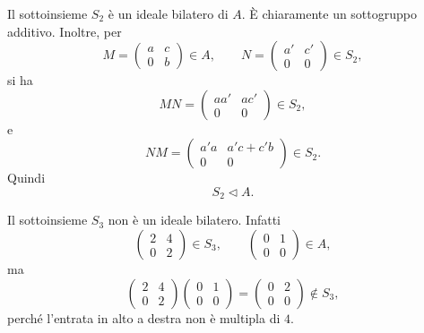 \documentclass[a4paper]{article}
\begin{document}
\begin{radioactive}
\begin{snippetsolution}{}
    Il sottoinsieme \(S_2\) è un ideale bilatero di \(A\).
    È chiaramente un sottogruppo additivo. Inoltre, per
    \[
        M=
        \begin{pmatrix}
            a & c \\
            0 & b
        \end{pmatrix}
        \in A,
        \qquad
        N=
        \begin{pmatrix}
            a' & c' \\
            0 & 0
        \end{pmatrix}
        \in S_2,
    \]
    si ha
    \[
        MN=
        \begin{pmatrix}
            aa' & ac' \\
            0 & 0
        \end{pmatrix}
        \in S_2,
    \]
    e
    \[
        NM=
        \begin{pmatrix}
            a'a & a'c+c'b \\
            0 & 0
        \end{pmatrix}
        \in S_2.
    \]
    Quindi
    \[
        S_2\triangleleft A.
    \]

    Il sottoinsieme \(S_3\) non è un ideale bilatero.
    Infatti
    \[
        \begin{pmatrix}
            2 & 4 \\
            0 & 2
        \end{pmatrix}
        \in S_3,
        \qquad
        \begin{pmatrix}
            0 & 1 \\
            0 & 0
        \end{pmatrix}
        \in A,
    \]
    ma
    \[
        \begin{pmatrix}
            2 & 4 \\
            0 & 2
        \end{pmatrix}
        \begin{pmatrix}
            0 & 1 \\
            0 & 0
        \end{pmatrix}
        =
        \begin{pmatrix}
            0 & 2 \\
            0 & 0
        \end{pmatrix}
        \notin S_3,
    \]
    perché l'entrata in alto a destra non è multipla di \(4\).
\end{snippetsolution}
\end{radioactive}
\end{document}
